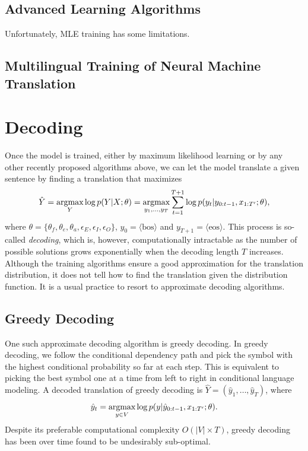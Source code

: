 \subsection{Advanced Learning Algorithms}
Unfortunately, MLE training has some limitations.
\citep{wiseman2016sequence,shen2015minimum,bahdanau2016actor,ranzato2015sequence}

\subsection{Multilingual Training of Neural Machine Translation}

\section{Decoding}
Once the model is trained, either by maximum likelihood learning or by any other recently proposed algorithms above, we can let the model translate a given sentence by finding a translation that maximizes 
\begin{equation}
\hat{Y} = \mathop{\text{argmax}}_{Y} \log p(Y|X; \theta) =\mathop{\text{argmax}}_{y_1, ..., y_T}\sum_{t=1}^{T+1} \log p(y_t| y_{0:t-1}, x_{1:T'}; \theta),
\end{equation}
where $\theta=\{\theta_f, \theta_e, \theta_a, \epsilon_E, \epsilon_I, \epsilon_O \}$, $y_0 = \langle \mathrm{bos}\rangle$ and $y_{T+1} = \langle \mathrm{eos}\rangle$. This process is so-called \textit{decoding}, which is, however, computationally intractable as the number of possible solutions grows exponentially when the decoding length $T$ increases. Although the training algorithms ensure a good approximation for the translation distribution, it does not tell how to find the translation given the distribution function. It is a usual practice to resort to approximate decoding algorithms.

\subsection{Greedy Decoding}

One such approximate decoding algorithm is greedy decoding. In greedy decoding, we follow the conditional dependency path and pick the symbol with the highest conditional probability so far at each step. This is equivalent to picking the best symbol one at a time from left to right in conditional language modeling. A decoded translation of greedy decoding is $\hat{Y} = (\hat{y}_1, \ldots, \hat{y}_T)$, where
\begin{equation}
\hat{y}_t =  \mathop{\text{argmax}}_{y \in V} \log p(y|\hat{y}_{0:t-1}, x_{1:T'}; \theta).
\end{equation}
Despite its preferable computational complexity $O(|V| \times T)$, greedy decoding has been over time found to be undesirably sub-optimal.%

